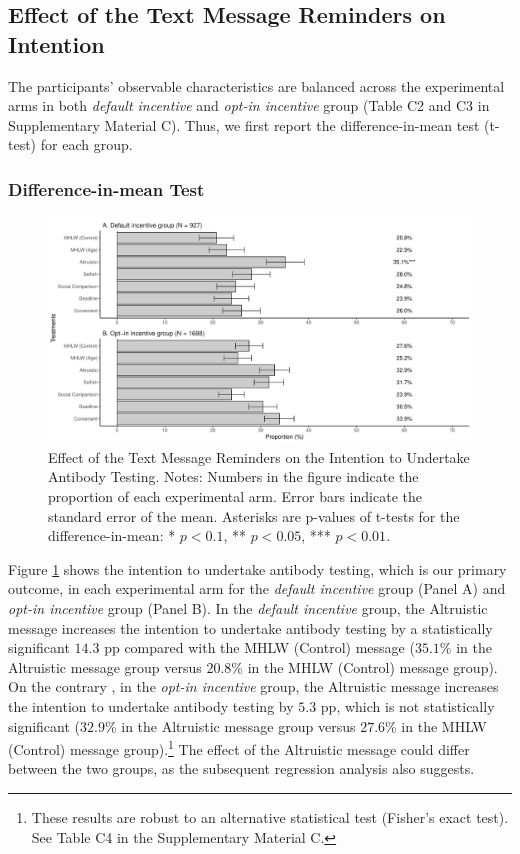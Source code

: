 \documentclass[
      12pt,
    a4paper
]{article}
\begin{document}
\hypertarget{intention}{%
\subsection{Effect of the Text Message Reminders on Intention}\label{intention}}

The participants' observable characteristics are balanced across the experimental arms in both \emph{default incentive} and \emph{opt-in incentive} group (Table C2 and C3 in Supplementary Material C). Thus, we first report the difference-in-mean test (t-test) for each group.

\hypertarget{difference-in-mean-test}{%
\subsubsection{Difference-in-mean Test}\label{difference-in-mean-test}}

\begin{figure}[t]
\includegraphics{Main-Document-LaTeX_files/figure-latex/ttest-int-test-1} \caption{Effect of the Text Message Reminders on the Intention to Undertake Antibody Testing. Notes: Numbers in the figure indicate the proportion of each experimental arm. Error bars indicate the standard error of the mean. Asterisks are p-values of t-tests for the difference-in-mean: * $p < 0.1$, ** $p < 0.05$, *** $p < 0.01$.}\label{fig:ttest-int-test}
\end{figure}

Figure \ref{fig:ttest-int-test} shows the intention to undertake antibody testing, which is our primary outcome, in each experimental arm for the \emph{default incentive} group (Panel A) and \emph{opt-in incentive} group (Panel B). In the \emph{default incentive} group, the Altruistic message increases the intention to undertake antibody testing by a statistically significant \(14.3\) pp compared with the MHLW (Control) message (\(35.1\)\% in the Altruistic message group versus \(20.8\)\% in the MHLW (Control) message group). On the contrary , in the \emph{opt-in incentive} group, the Altruistic message increases the intention to undertake antibody testing by \(5.3\) pp, which is not statistically significant (\(32.9\)\% in the Altruistic message group versus \(27.6\)\% in the MHLW (Control) message group).\footnote{These results are robust to an alternative statistical test (Fisher's exact test). See Table C4 in the Supplementary Material C.} The effect of the Altruistic message could differ between the two groups, as the subsequent regression analysis also suggests.
\end{document}
